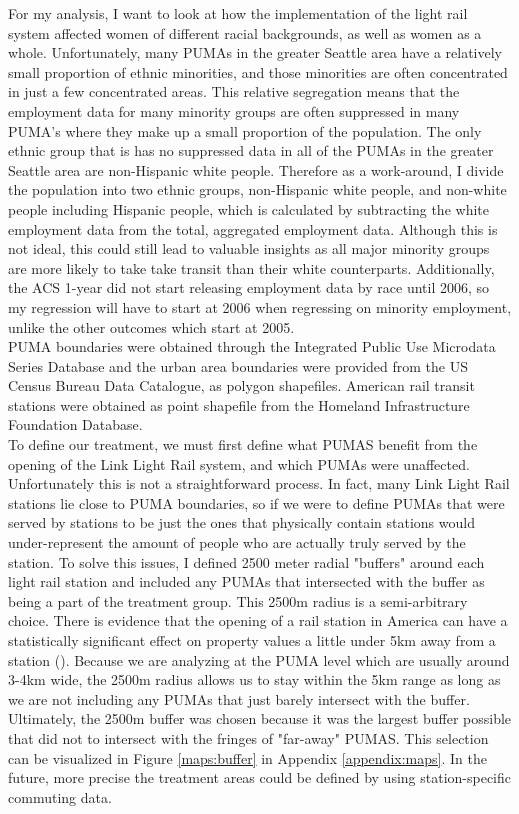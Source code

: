 \documentclass[A4paper,12pt]{article}
\begin{document}
For my analysis, I want to look at how the implementation of the light rail system affected women of different racial backgrounds, as well as women as a whole. Unfortunately, many PUMAs in the greater Seattle area have a relatively small proportion of ethnic minorities, and those minorities are often concentrated in just a few concentrated areas. This relative segregation means that the employment data for many minority groups are often suppressed in many PUMA's where they make up a small proportion of the population. The only ethnic group that is has no suppressed data in all of the PUMAs in the greater Seattle area are non-Hispanic white people. Therefore as a work-around, I divide the population into two ethnic groups, non-Hispanic white people, and non-white people including Hispanic people, which is calculated by subtracting the white employment data from the total, aggregated employment data. Although this is not ideal, this could still lead to valuable insights as all major minority groups are more likely to take take transit than their white counterparts. Additionally, the ACS 1-year did not start releasing employment data by race until 2006, so my regression will have to start at 2006 when regressing on minority employment, unlike the other outcomes which start at 2005.\\

PUMA boundaries were obtained through the Integrated Public Use Microdata Series Database and the urban area boundaries were provided from the US Census Bureau Data Catalogue, as polygon shapefiles. American rail transit stations were obtained as point shapefile from the Homeland Infrastructure Foundation Database. \\

To define our treatment, we must first define what PUMAS benefit from the opening of the Link Light Rail system, and which PUMAs were unaffected. Unfortunately this is not a straightforward process. In fact, many Link Light Rail stations lie close to PUMA boundaries, so if we were to define PUMAs that were served by stations to be just the ones that physically contain stations would under-represent the amount of people who are actually truly served by the station. To solve this issues, I defined 2500 meter radial "buffers" around each light rail station and included any PUMAs that intersected with the buffer as being a part of the treatment group. This 2500m radius is a semi-arbitrary choice. There is evidence that the opening of a rail station in America can have a statistically significant effect on property values a little under 5km away from a station (\cite{debrezion_impact_2007}). Because we are analyzing at the PUMA level which are usually around 3-4km wide, the 2500m radius allows us to stay within the 5km range as long as we are not including any PUMAs that just barely intersect with the buffer. Ultimately, the 2500m buffer was chosen because it was the largest buffer possible that did not to intersect with the fringes of "far-away" PUMAS. This selection can be visualized in Figure \ref{maps:buffer} in Appendix \ref{appendix:maps}. In the future, more precise the treatment areas could be defined by using station-specific commuting data. \\
\end{document}
